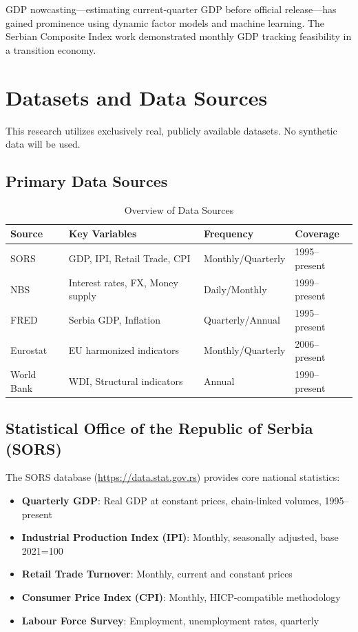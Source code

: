 \documentclass[12pt,a4paper]{article}
\begin{document}
GDP nowcasting---estimating current-quarter GDP before official release---has gained prominence using dynamic factor models and machine learning. The Serbian Composite Index work \citep{vukmirovic2009sci, vukmirovic2010flash, vukmirovic2013ntts} demonstrated monthly GDP tracking feasibility in a transition economy.

\section{Datasets and Data Sources}

This research utilizes exclusively real, publicly available datasets. No synthetic data will be used.

\subsection{Primary Data Sources}

\begin{table}[htbp]
\centering
\caption{Overview of Data Sources}
\label{tab:datasources}
\begin{tabular}{@{}llll@{}}
\toprule
\textbf{Source} & \textbf{Key Variables} & \textbf{Frequency} & \textbf{Coverage} \\
\midrule
SORS & GDP, IPI, Retail Trade, CPI & Monthly/Quarterly & 1995--present \\
NBS & Interest rates, FX, Money supply & Daily/Monthly & 1999--present \\
FRED & Serbia GDP, Inflation & Quarterly/Annual & 1995--present \\
Eurostat & EU harmonized indicators & Monthly/Quarterly & 2006--present \\
World Bank & WDI, Structural indicators & Annual & 1990--present \\
\bottomrule
\end{tabular}
\end{table}

\subsection{Statistical Office of the Republic of Serbia (SORS)}

The SORS database (\url{https://data.stat.gov.rs}) provides core national statistics:

\begin{itemize}[leftmargin=*]
    \item \textbf{Quarterly GDP}: Real GDP at constant prices, chain-linked volumes, 1995--present
    \item \textbf{Industrial Production Index (IPI)}: Monthly, seasonally adjusted, base 2021=100
    \item \textbf{Retail Trade Turnover}: Monthly, current and constant prices
    \item \textbf{Consumer Price Index (CPI)}: Monthly, HICP-compatible methodology
    \item \textbf{Labour Force Survey}: Employment, unemployment rates, quarterly
\end{itemize}
\end{document}
